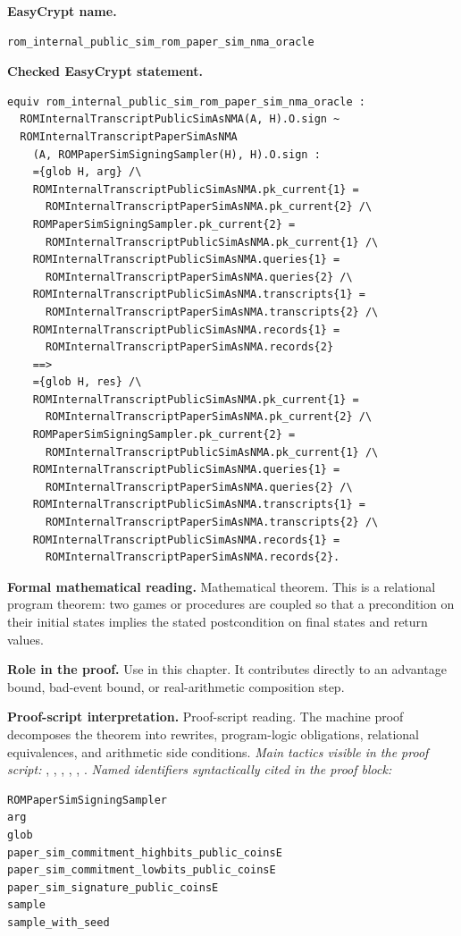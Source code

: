\begin{formaltheorem}
\noindent\textbf{EasyCrypt name.}
\begin{lstlisting}[language=EasyCrypt,basicstyle=\ttfamily\scriptsize]
rom_internal_public_sim_rom_paper_sim_nma_oracle
\end{lstlisting}
\noindent\textbf{Checked EasyCrypt statement.}
\begin{lstlisting}[language=EasyCrypt,basicstyle=\ttfamily\scriptsize]
equiv rom_internal_public_sim_rom_paper_sim_nma_oracle :
  ROMInternalTranscriptPublicSimAsNMA(A, H).O.sign ~
  ROMInternalTranscriptPaperSimAsNMA
    (A, ROMPaperSimSigningSampler(H), H).O.sign :
    ={glob H, arg} /\
    ROMInternalTranscriptPublicSimAsNMA.pk_current{1} =
      ROMInternalTranscriptPaperSimAsNMA.pk_current{2} /\
    ROMPaperSimSigningSampler.pk_current{2} =
      ROMInternalTranscriptPublicSimAsNMA.pk_current{1} /\
    ROMInternalTranscriptPublicSimAsNMA.queries{1} =
      ROMInternalTranscriptPaperSimAsNMA.queries{2} /\
    ROMInternalTranscriptPublicSimAsNMA.transcripts{1} =
      ROMInternalTranscriptPaperSimAsNMA.transcripts{2} /\
    ROMInternalTranscriptPublicSimAsNMA.records{1} =
      ROMInternalTranscriptPaperSimAsNMA.records{2}
    ==>
    ={glob H, res} /\
    ROMInternalTranscriptPublicSimAsNMA.pk_current{1} =
      ROMInternalTranscriptPaperSimAsNMA.pk_current{2} /\
    ROMPaperSimSigningSampler.pk_current{2} =
      ROMInternalTranscriptPublicSimAsNMA.pk_current{1} /\
    ROMInternalTranscriptPublicSimAsNMA.queries{1} =
      ROMInternalTranscriptPaperSimAsNMA.queries{2} /\
    ROMInternalTranscriptPublicSimAsNMA.transcripts{1} =
      ROMInternalTranscriptPaperSimAsNMA.transcripts{2} /\
    ROMInternalTranscriptPublicSimAsNMA.records{1} =
      ROMInternalTranscriptPaperSimAsNMA.records{2}.
\end{lstlisting}
\noindent\textbf{Formal mathematical reading.}
Mathematical theorem. This is a relational program theorem: two games or procedures are coupled so that a precondition on their initial states implies the stated postcondition on final states and return values.

\noindent\textbf{Role in the proof.}
Use in this chapter. It contributes directly to an advantage bound, bad-event bound, or real-arithmetic composition step.

\noindent\textbf{Proof-script interpretation.}
Proof-script reading. The machine proof decomposes the theorem into rewrites, program-logic obligations, relational equivalences, and arithmetic side conditions.
\emph{Main tactics visible in the proof script:} , , , , , .
\emph{Named identifiers syntactically cited in the proof block:}
\begin{lstlisting}[language=EasyCrypt,basicstyle=\ttfamily\scriptsize]
ROMPaperSimSigningSampler
arg
glob
paper_sim_commitment_highbits_public_coinsE
paper_sim_commitment_lowbits_public_coinsE
paper_sim_signature_public_coinsE
sample
sample_with_seed
\end{lstlisting}

\end{formaltheorem}

